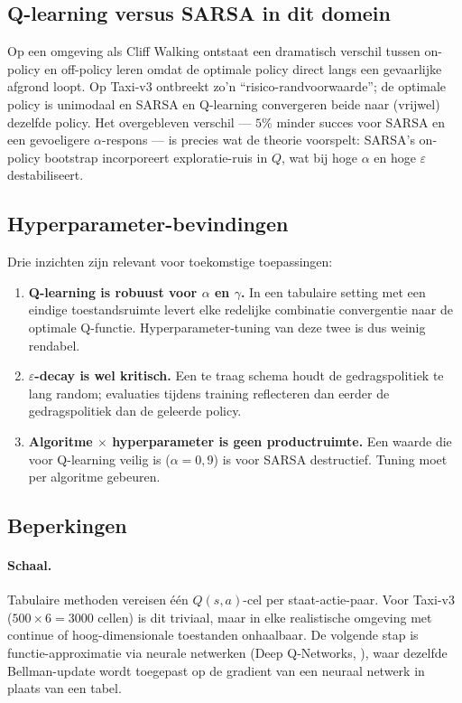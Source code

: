 \documentclass[11pt,a4paper]{article}
\begin{document}
\subsection{Q-learning versus SARSA in dit domein}

Op een omgeving als Cliff Walking
\citep[Voorbeeld 6.6]{sutton_barto_2018} ontstaat een dramatisch
verschil tussen on-policy en off-policy leren omdat de optimale policy
direct langs een gevaarlijke afgrond loopt. Op Taxi-v3 ontbreekt zo'n
``risico-randvoorwaarde''; de optimale policy is unimodaal en SARSA en
Q-learning convergeren beide naar (vrijwel) dezelfde policy. Het
overgebleven verschil --- $5\%$ minder succes voor SARSA en een
gevoeligere $\alpha$-respons --- is precies wat de theorie voorspelt:
SARSA's on-policy bootstrap incorporeert exploratie-ruis in $Q$, wat
bij hoge $\alpha$ en hoge $\varepsilon$ destabiliseert.

\subsection{Hyperparameter-bevindingen}

Drie inzichten zijn relevant voor toekomstige toepassingen:

\begin{enumerate}
  \item \textbf{Q-learning is robuust voor $\alpha$ en $\gamma$.}
        In een tabulaire setting met een eindige toestandsruimte
        levert elke redelijke combinatie convergentie naar de optimale
        Q-functie. Hyperparameter-tuning van deze twee is dus weinig
        rendabel.
  \item \textbf{$\varepsilon$-decay is wel kritisch.} Een te
        traag schema houdt de gedragspolitiek te lang random;
        evaluaties tijdens training reflecteren dan eerder de
        gedragspolitiek dan de geleerde policy.
  \item \textbf{Algoritme $\times$ hyperparameter is geen
        productruimte.} Een waarde die voor Q-learning veilig is
        ($\alpha=0{,}9$) is voor SARSA destructief. Tuning moet per
        algoritme gebeuren.
\end{enumerate}

\subsection{Beperkingen}

\paragraph{Schaal.} Tabulaire methoden vereisen \'e\'en
$Q(s,a)$-cel per staat-actie-paar. Voor Taxi-v3 ($500 \times 6 = 3000$
cellen) is dit triviaal, maar in elke realistische omgeving met
continue of hoog-dimensionale toestanden onhaalbaar. De volgende stap
is functie-approximatie via neurale netwerken (Deep Q-Networks,
\cite{mnih_2015}), waar dezelfde Bellman-update wordt toegepast op de
gradient van een neuraal netwerk in plaats van een tabel.
\end{document}
